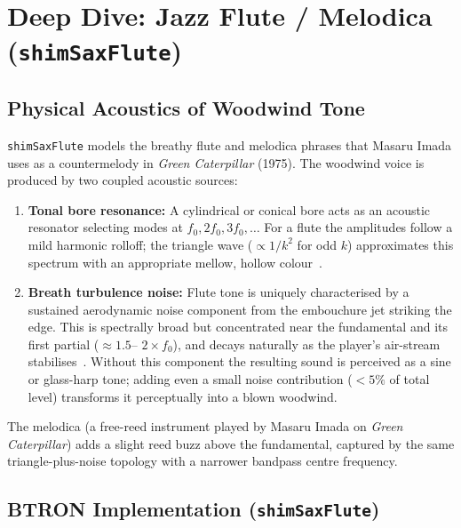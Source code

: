 \documentclass[10pt,journal,compsoc,twocolumn]{article}
\begin{document}
\section{Deep Dive: Jazz Flute / Melodica (\texttt{shimSaxFlute})}
\label{sec:saxflute}

\subsection{Physical Acoustics of Woodwind Tone}

\texttt{shimSaxFlute} models the breathy flute and melodica phrases that
Masaru Imada uses as a countermelody in \emph{Green Caterpillar} (1975).
The woodwind voice is produced by two coupled acoustic sources:

\begin{enumerate}[leftmargin=*]
    \item \textbf{Tonal bore resonance:}  A cylindrical or conical bore acts
    as an acoustic resonator selecting modes at $f_0, 2f_0, 3f_0, \ldots$
    For a flute the amplitudes follow a mild harmonic rolloff; the triangle
    wave ($\propto 1/k^2$ for odd $k$) approximates this spectrum with an
    appropriate mellow, hollow colour~\cite{fletcher1998physics}.

    \item \textbf{Breath turbulence noise:}  Flute tone is uniquely
    characterised by a sustained aerodynamic noise component from the
    embouchure jet striking the edge.  This is spectrally broad but
    concentrated near the fundamental and its first partial ($\approx 1.5$--
    $2\times f_0$), and decays naturally as the player's air-stream
    stabilises~\cite{farnell2010designing}.  Without this component the
    resulting sound is perceived as a sine or glass-harp tone; adding even a
    small noise contribution ($<5\%$ of total level) transforms it
    perceptually into a blown woodwind.
\end{enumerate}

The melodica (a free-reed instrument played by Masaru Imada on
\emph{Green Caterpillar}) adds a slight reed buzz above the fundamental,
captured by the same triangle-plus-noise topology with a narrower bandpass
centre frequency.

\subsection{BTRON Implementation (\texttt{shimSaxFlute})}
\end{document}
